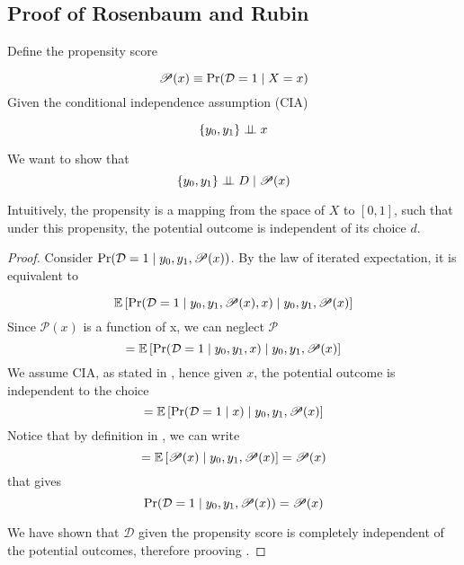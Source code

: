 \subsection{Proof of Rosenbaum and Rubin}

Define the propensity score 

\newcommand{\ps}{\mathscr{P}}
\newcommand{\prob}{\mathrm{Pr}}
\newcommand{\D}{\mathcal{D}}

\begin{equation}
    \label{eq:pscore}
    \ps(x) \equiv \prob(\D = 1 \given X=x)
\end{equation}
Given the conditional independence assumption (CIA)

\begin{equation} 
    \label{eq:CIA}
    \{ y_0, y_1 \}\perp \!\!\! \perp x
\end{equation}

We want to show that 
\begin{equation}
    \label{eq:RR}
    \{ y_0, y_1 \} \indep D \given \ps(x)
\end{equation}

Intuitively, the propensity is a mapping from the space of $X$ to $[0,1]$, such that under this propensity, the potential outcome is independent of its choice $d$.

\begin{proof}
    Consider $\Pr(\D = 1 \given y_0, y_1, \ps(x))$. By the law of iterated expectation, it is equivalent to

    $$
        \E\left[
            \Pr(
                \D = 1 \given y_0, y_1, \ps(x), x
            )
            \given
            y_0, y_1, \ps(x)
        \right]
    $$
    Since $\ps(x)$ is a function of x, we can neglect $\ps$
    $$
        =\E\left[
            \Pr(
                \D = 1 \given y_0, y_1, x
            )
            \given
            y_0, y_1, \ps(x)
        \right]
    $$
    We assume CIA, as stated in , hence given $x$, the potential outcome is independent to the choice
    $$
    =\E\left[
        \Pr(
            \D = 1 \given x
        )
        \given
        y_0, y_1, \ps(x)
    \right]
    $$
    Notice that by definition in , we can write
    $$
    =\E\left[
            \ps(x)
        \given
        y_0, y_1, \ps(x)
    \right]
    =\ps(x)
    $$
    that gives
    $$
    \Pr(\D = 1 \given y_0, y_1, \ps(x))
    = \ps(x)
    $$

    We have shown that $\D$ given the propensity score is completely independent of the potential outcomes, therefore prooving .


\end{proof}